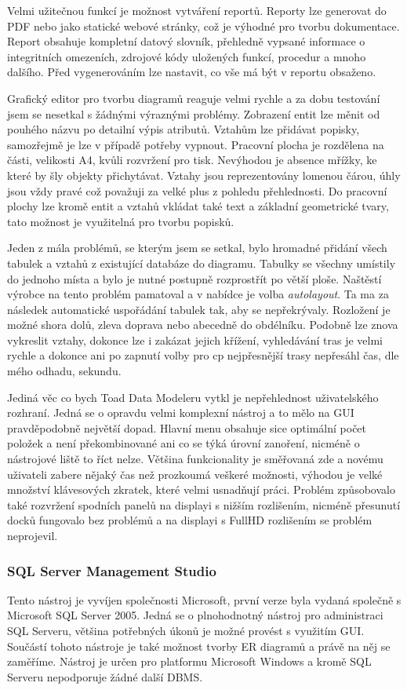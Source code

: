 \documentclass[czech,bachelor,public,dept460,male,oneside]{diploma}
\begin{document}
		Velmi užitečnou funkcí je možnost vytváření reportů. Reporty lze generovat do PDF nebo jako statické webové stránky, což je výhodné pro tvorbu dokumentace. Report obsahuje kompletní datový slovník, přehledně vypsané informace o integritních omezeních, zdrojové kódy uložených funkcí, procedur a mnoho dalšího. Před vygenerováním lze nastavit, co vše má být v reportu obsaženo.
		
		Grafický editor pro tvorbu diagramů reaguje velmi rychle a za dobu testování jsem se nesetkal s žádnými výraznými problémy. Zobrazení entit lze měnit od  pouhého názvu po detailní výpis atributů. Vztahům lze přidávat popisky, samozřejmě je lze v případě potřeby vypnout. Pracovní plocha je rozdělena na části, velikosti A4, kvůli rozvržení pro tisk. Nevýhodou je absence mřížky, ke které by šly objekty přichytávat. Vztahy jsou reprezentovány lomenou čárou, úhly jsou vždy pravé což považuji za velké plus z pohledu přehlednosti. Do pracovní plochy lze kromě entit a vztahů vkládat také text a základní geometrické tvary, tato možnost je využitelná pro tvorbu popisků.
		
		Jeden z mála problémů, se kterým jsem se setkal, bylo hromadné přidání všech tabulek a vztahů z existující databáze do diagramu. Tabulky se všechny umístily do jednoho místa a bylo je nutné postupně rozprostřít po větší ploše. Naštěstí výrobce na tento problém pamatoval a v nabídce je volba \textit{autolayout}. Ta ma za následek automatické uspořádání tabulek tak, aby se nepřekrývaly. Rozložení je možné shora dolů, zleva doprava nebo abecedně do obdélníku. Podobně lze znova vykreslit vztahy, dokonce lze i zakázat jejich křížení, vyhledávání tras je velmi rychle a dokonce ani po zapnutí volby pro cp nejpřesnější trasy nepřesáhl čas, dle mého odhadu, sekundu. 
		
		Jediná věc co bych Toad Data Modeleru vytkl je nepřehlednost uživatelského rozhraní. Jedná se o opravdu velmi komplexní nástroj a to mělo na GUI pravděpodobně největší dopad. Hlavní menu obsahuje sice optimální počet položek a není překombinované ani co se týká úrovní zanoření, nicméně o nástrojové liště to říct nelze. Většina funkcionality je směřovaná zde a novému uživateli zabere nějaký čas než prozkoumá veškeré možnosti, výhodou je velké množství klávesových zkratek, které velmi usnadňují práci. Problém způsobovalo také rozvržení spodních panelů na displayi s nižším rozlišením, nicméně přesunutí docků fungovalo bez problémů a na displayi s FullHD rozlišením se problém neprojevil.
		
		\subsubsection{SQL Server Management Studio}
		Tento nástroj je vyvíjen společnosti Microsoft, první verze byla vydaná společně s Microsoft SQL Server 2005. Jedná se o plnohodnotný nástroj pro administraci SQL Serveru, většina potřebných úkonů je možné provést s využitím GUI. Součástí tohoto nástroje je také možnost tvorby ER diagramů a právě na něj se zaměříme. Nástroj je určen pro platformu Microsoft Windows a kromě SQL Serveru nepodporuje žádné další DBMS.
		
\end{document}
